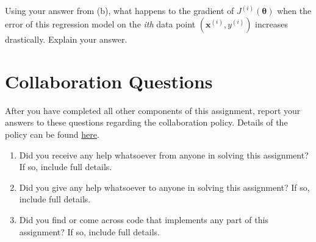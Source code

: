 \documentclass[11pt,addpoints,answers]{exam}
\begin{document}
\begin{questions}
\begin{parts}
\begin{subparts}
        \begin{your_solution}[title=Your answer:,height=4cm,width=15cm]
        \end{your_solution}

        \clearpage
        
        \subpart[2]
        Using your answer from (b), what happens to the gradient of $J^{(i)}(\bm\theta)$ when the error of this regression model on the \textit{ith} data point $(\bm{x}^{(i)}, y^{(i)})$ increases drastically. Explain your answer.

        \begin{your_solution}[title=Your Answer,height=5.5cm,width=15cm]
            
        \end{your_solution}
        
        
    \end{subparts}
    
\end{parts}



\end{questions}

\newpage
\section{Collaboration Questions}
After you have completed all other components of this assignment, report your answers to these questions regarding the collaboration policy. Details of the policy can be found \href{http://www.cs.cmu.edu/~mgormley/courses/10601/syllabus.html}{here}.
\begin{enumerate}
    \item Did you receive any help whatsoever from anyone in solving this assignment? If so, include full details.
    \item Did you give any help whatsoever to anyone in solving this assignment? If so, include full details.
    \item Did you find or come across code that implements any part of this assignment? If so, include full details.
\end{enumerate}

\begin{your_solution}[height=6cm]

\end{your_solution}
    
\end{document}
